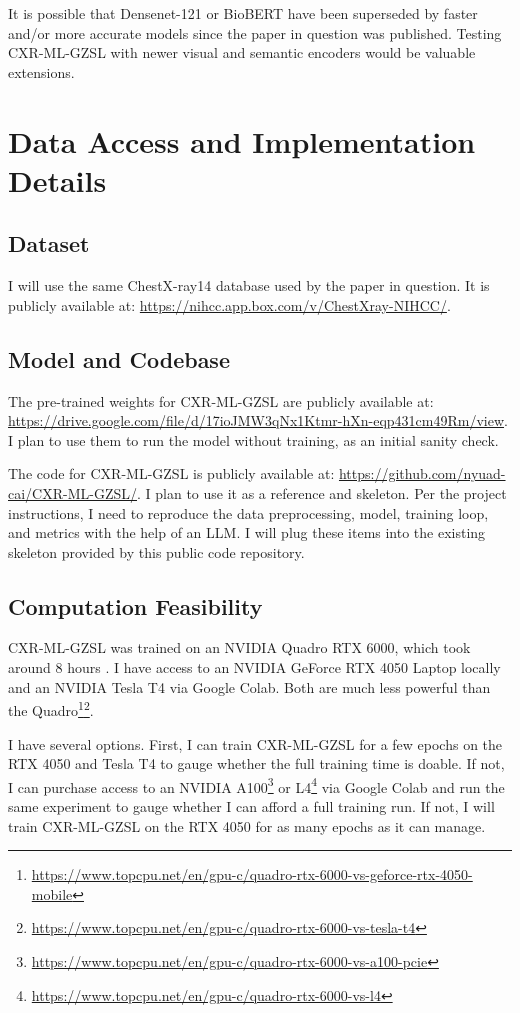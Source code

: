 \documentclass[letterpaper]{article} %
\begin{document}
It is possible that Densenet-121 or BioBERT have been superseded by faster and/or more accurate models since the paper in question was published. Testing CXR-ML-GZSL with newer visual and semantic encoders would be valuable extensions.

\section{Data Access and Implementation Details}

\subsection{Dataset}

I will use the same ChestX-ray14 database \cite{Wang_2017} used by the paper in question. It is publicly available at: \url{https://nihcc.app.box.com/v/ChestXray-NIHCC/}.

\subsection{Model and Codebase}

The pre-trained weights for CXR-ML-GZSL are publicly available at: \url{https://drive.google.com/file/d/17ioJMW3qNx1Ktmr-hXn-eqp431cm49Rm/view}. I plan to use them to run the model without training, as an initial sanity check.

The code for CXR-ML-GZSL is publicly available at: \url{https://github.com/nyuad-cai/CXR-ML-GZSL/}. I plan to use it as a reference and skeleton. Per the project instructions, I need to reproduce the data preprocessing, model, training loop, and metrics with the help of an LLM. I will plug these items into the existing skeleton provided by this public code repository.

\subsection{Computation Feasibility}
\label{sec:computation-feasibility}

CXR-ML-GZSL was trained on an NVIDIA Quadro RTX 6000, which took around 8 hours \cite{hayat2021multilabel}. I have access to an NVIDIA GeForce RTX 4050 Laptop locally and an NVIDIA Tesla T4 via Google Colab. Both are much less powerful than the Quadro\footnote{\url{https://www.topcpu.net/en/gpu-c/quadro-rtx-6000-vs-geforce-rtx-4050-mobile}}\footnote{\url{https://www.topcpu.net/en/gpu-c/quadro-rtx-6000-vs-tesla-t4}}.

I have several options. First, I can train CXR-ML-GZSL for a few epochs on the RTX 4050 and Tesla T4 to gauge whether the full training time is doable. If not, I can purchase access to an NVIDIA A100\footnote{\url{https://www.topcpu.net/en/gpu-c/quadro-rtx-6000-vs-a100-pcie}} or L4\footnote{\url{https://www.topcpu.net/en/gpu-c/quadro-rtx-6000-vs-l4}} via Google Colab and run the same experiment to gauge whether I can afford a full training run. If not, I will train CXR-ML-GZSL on the RTX 4050 for as many epochs as it can manage.


\end{document}
